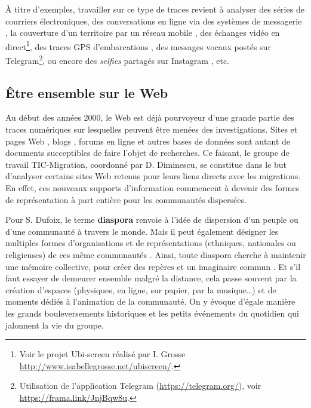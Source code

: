 \documentclass[symmetric,justified,marginals=raggedouter]{tufte-book}
\begin{document}
À titre d'exemples, travailler sur ce type de traces revient à analyser des séries de courriers électroniques, des conversations en ligne via des systèmes de messagerie \citep{dekker_smart_2018}, la couverture d'un territoire par un réseau mobile \citep{sanchez-querubin_connected_2018}, des échanges vidéo en direct\footnote{\RaggedOuter Voir le projet Ubi-screen réalisé par I. Grosse \url{http://www.isabellegrosse.net/ubiscreen/}.}, des traces GPS d'embarcations \citep{heller__2014}, des messages vocaux postés sur Telegram\footnote{\RaggedOuter Utilisation de l'application Telegram (\url{https://telegram.org/}), voir \url{https://frama.link/JnjBqw8u}.}, ou encore des \textit{selfies} partagés sur Instagram \citep{risam_now_2018}, etc. 

\subsection{Être ensemble sur le Web}

\noindent Au début des années 2000, le Web est déjà pourvoyeur d'une grande partie des traces numériques sur lesquelles peuvent être menées des investigations.  Sites et pages Web \citep{tyner_pan-national_2000}, blogs \citep{park_developing_2008}, forums en ligne \citep{van_den_bos_territorial_2006} et autres bases de données sont autant de documents succeptibles de faire l'objet de recherches. Ce faisant, le groupe de travail TIC-Migration, coordonné par D. Diminescu, se constitue dans le but d'analyser certains sites Web retenus pour leurs liens directs avec les migrations. En effet, ces nouveaux supports d'information commencent à devenir des formes de représentation à part entière pour les communautés dispersées. 

Pour S. Dufoix, le terme \textbf{diaspora} renvoie à l'idée de dispersion d'un peuple ou d'une communauté à travers le monde. Mais il peut également désigner les multiples formes d'organisations et de représentations (ethniques, nationales ou religieuses) de ces même communautés \citep{dufoix_les_2003}. Ainsi, toute diaspora cherche à maintenir une mémoire collective, pour créer des repères et un imaginaire commun \citep{bernal_diaspora_2006}. Et s'il faut essayer de demeurer ensemble malgré la distance, cela passe souvent par la création d'espaces (physiques, en ligne, sur papier, par la musique\ldots{}) et de moments dédiés à l'animation de la communauté. On y évoque d'égale manière les grands bouleversements historiques et les petits événements du quotidien \citep{koukoutsaki-monnier_deterritorialising_2012} qui jalonnent la vie du groupe. 
\end{document}
